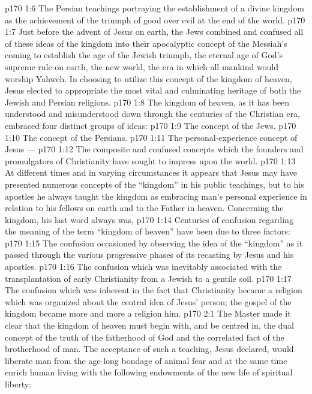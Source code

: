 \vs p170 1:6 \bibnobreakspace The Persian teachings portraying the establishment of a divine kingdom as the achievement of the triumph of good over evil at the end of the world.
\vs p170 1:7 \pc Just before the advent of Jesus on earth, the Jews combined and confused all of these ideas of the kingdom into their apocalyptic concept of the Messiah’s coming to establish the age of the Jewish triumph, the eternal age of God’s supreme rule on earth, the new world, the era in which all mankind would worship Yahweh. In choosing to utilize this concept of the kingdom of heaven, Jesus elected to appropriate the most vital and culminating heritage of both the Jewish and Persian religions.
\vs p170 1:8 The kingdom of heaven, as it has been understood and misunderstood down through the centuries of the Christian era, embraced four distinct groups of ideas:
\vs p170 1:9 \bibnobreakspace The concept of the Jews.
\vs p170 1:10 \bibnobreakspace The concept of the Persians.
\vs p170 1:11 \bibnobreakspace The personal\hyp{}experience concept of Jesus --- 
\vs p170 1:12 \bibnobreakspace The composite and confused concepts which the founders and promulgators of Christianity have sought to impress upon the world.
\vs p170 1:13 \pc At different times and in varying circumstances it appears that Jesus may have presented numerous concepts of the “kingdom” in his public teachings, but to his apostles he always taught the kingdom as embracing man’s personal experience in relation to his fellows on earth and to the Father in heaven. Concerning the kingdom, his last word always was, 
\vs p170 1:14 Centuries of confusion regarding the meaning of the term “kingdom of heaven” have been due to three factors:
\vs p170 1:15 \bibnobreakspace The confusion occasioned by observing the idea of the “kingdom” as it passed through the various progressive phases of its recasting by Jesus and his apostles.
\vs p170 1:16 \bibnobreakspace The confusion which was inevitably associated with the transplantation of early Christianity from a Jewish to a gentile soil.
\vs p170 1:17 \bibnobreakspace The confusion which was inherent in the fact that Christianity became a religion which was organized about the central idea of Jesus’ person; the gospel of the kingdom became more and more a religion  him.
\vs p170 2:1 The Master made it clear that the kingdom of heaven must begin with, and be centred in, the dual concept of the truth of the fatherhood of God and the correlated fact of the brotherhood of man. The acceptance of such a teaching, Jesus declared, would liberate man from the age\hyp{}long bondage of animal fear and at the same time enrich human living with the following endowments of the new life of spiritual liberty:
